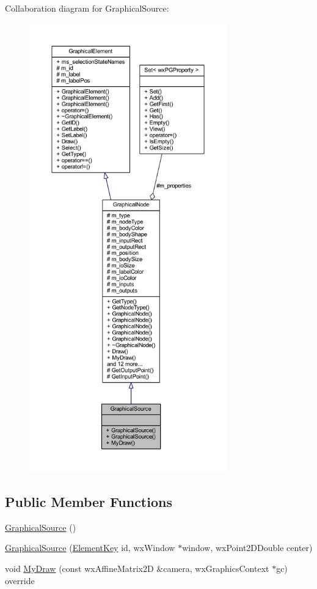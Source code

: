 Collaboration diagram for Graphical\+Source\+:
\nopagebreak
\begin{figure}[H]
\begin{center}
\leavevmode
\includegraphics[height=550pt]{class_graphical_source__coll__graph}
\end{center}
\end{figure}
\subsection*{Public Member Functions}
\begin{DoxyCompactItemize}
\item 
\hyperlink{class_graphical_source_ad798712e86d821da957bbb7864d76c5a}{Graphical\+Source} ()
\item 
\hyperlink{class_graphical_source_ad557a50f4519460a53e8f7b6f4b21f5b}{Graphical\+Source} (\hyperlink{_graphical_element_8h_ade5fd6c85839a416577ff9de1605141e}{Element\+Key} id, wx\+Window $\ast$window, wx\+Point2\+D\+Double center)
\item 
void \hyperlink{class_graphical_source_af01b1de06f0e6653edd60b59a279b154}{My\+Draw} (const wx\+Affine\+Matrix2D \&camera, wx\+Graphics\+Context $\ast$gc) override
\end{DoxyCompactItemize}
